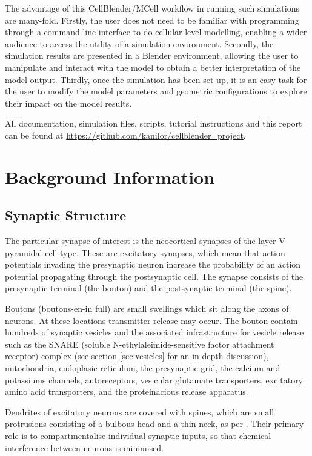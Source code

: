 \documentclass[a4paper]{article}
\begin{document}
The advantage of this CellBlender/MCell workflow in running such simulations are many-fold. Firstly, the user does not need to be familiar with programming through a command line interface to do cellular level modelling, enabling a wider audience to access the utility of a simulation environment. Secondly, the simulation results are presented in a Blender environment, allowing the user to manipulate and interact with the model to obtain a better interpretation of the model output. Thirdly, once the simulation has been set up, it is an easy task for the user to modify the model parameters and geometric configurations to explore their impact on the model results. 

All documentation, simulation files, scripts, tutorial instructions and this report can be found at \url{https://github.com/kanilor/cellblender_project}.

\section{Background Information}

\subsection{Synaptic Structure}
The particular synapse of interest is the  neocortical synapses of the layer V pyramidal cell type. These are excitatory synapses, which mean that action potentials invading the presynaptic neuron increase the probability of an action potential propagating through the postsynaptic cell. The synapse consists of the presynaptic terminal (the bouton) and the postsynaptic terminal (the spine). 

Boutons (boutons-en-in full) are small swellings which sit along the axons of neurons. At these locations transmitter release may occur. The bouton contain hundreds of synaptic vesicles and the associated infrastructure for vesicle release such as the SNARE (soluble N-ethylaleimide-sensitive factor attachment receptor) complex (see section \ref{sec:vesicles} for an in-depth discussion), mitochondria, endoplasic reticulum, the presynaptic grid, the calcium and potassiums channels, autoreceptors, vesicular glutamate transporters, excitatory amino acid transporters, and the proteinacious release apparatus.

Dendrites of excitatory neurons are covered with spines, which are small protrusions consisting of a bulbous head and a thin neck, as per \cite{Arellano:FrontNeurosci:2007}. Their primary role is to compartmentalise individual synaptic inputs, so that chemical interference between neurons is minimised.
\end{document}
